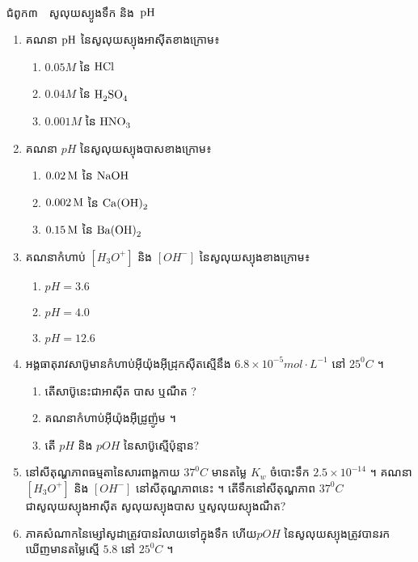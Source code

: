 \documentclass[12pt, a4paper]{article}
\begin{document}
	\begin{center}
		\sffamily\color{black}
		\\
		ជំពូក៣~~សូលុយស្យូងទឹក និង~$\ce{pH}$
	\end{center}
\maketitle
\begin{enumerate}[m]
	\item គណនា $\ce{pH}$ នៃសូលុយស្យុងអាស៊ីតខាងក្រោម៖
	\begin{enumerate}[k,3]
		\item $0.05M$ នៃ $\ce{HCl}$
		\item $0.04M$ នៃ $\ce{H2SO4}$
		\item $0.001M$ នៃ $\ce{HNO3}$
	\end{enumerate}
	\item គណនា $pH$ នៃសូលុយស្យុងបាសខាងក្រោម៖
	\begin{enumerate}[k, 3]
		\item $\ce{0.02M}$ នៃ $\ce{NaOH}$
		\item $\ce{0.002M}$ នៃ $\ce{Ca(OH)2}$
		\item $\ce{0.15M}$ នៃ $\ce{Ba(OH)2}$
	\end{enumerate}
	\item គណនាកំហាប់ $\left[H_3O^{+}\right]$ និង $\left[OH^{-}\right]$ នៃសូលុយស្យុងខាងក្រោម៖
	\begin{enumerate}[k,3]
		\item $pH=3.6$
		\item $pH=4.0$
		\item $pH=12.6$
	\end{enumerate}
	\item អង្គធាតុរាវសាប៊ូមានកំហាប់អុីយ៉ុងអុីដ្រុកសុីតស្មើនឹង $6.8\times 10^{-5}mol\cdot L^{-1}$ នៅ $25^{0}C$ ។
	\begin{enumerate}[k]
		\item តើសាប៊ូនេះជាអាសុីត បាស ឬណឺត ?
		\item គណនាកំហាប់អុីយ៉ុងអុីដ្រូញ៉ូម ។
		\item តើ $pH$ និង $pOH$ នៃសាប៊ូស្មើប៉ុន្មាន?
	\end{enumerate}
	\item នៅសីតុណ្ហភាពធម្មតានៃសារពាង្គកាយ $37^{0}C$ មានតម្លៃ $K_w$ ចំបោះទឹក $2.5\times 10^{-14}$ ។ គណនា $\left[H_3O^{+}\right]$ និង $\left[OH^{-}\right]$ នៅសីតុណ្ហភាពនេះ ។ តើទឹកនៅសីតុណ្ហភាព $37^{0}C$ ជាសូលុយស្យុងអាសុីត សូលុយស្យុងបាស ឬសូលុយស្យុងណឺត?
	\item ភាគសំណាកនៃម្សៅសូដាត្រូវបានរំលាយទៅក្នុងទឹក ហើយ​ $pOH$ នៃសូលុយស្យុងត្រូវបានរកឃើញមានតម្លៃស្មើ $5.8$ នៅ $25^{0}C$ ។

\end{enumerate}
\end{document}
